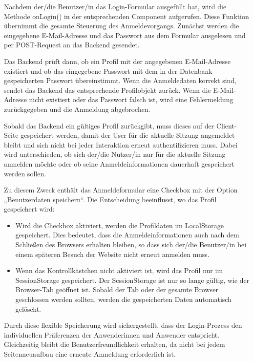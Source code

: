 Nachdem der/die Benutzer/in das Login-Formular ausgefüllt hat, wird die Methode onLogin() in der entsprechenden Component aufgerufen. Diese Funktion übernimmt die gesamte Steuerung des Anmeldevorgangs. Zunächst werden die eingegebene E-Mail-Adresse und das Passwort aus dem Formular ausgelesen und per POST-Request an das Backend gesendet.

Das Backend prüft dann, ob ein Profil mit der angegebenen E-Mail-Adresse existiert und ob das eingegebene Passwort mit dem in der Datenbank gespeicherten Passwort übereinstimmt. Wenn die Anmeldedaten korrekt sind, sendet das Backend das entsprechende Profilobjekt zurück. Wenn die E-Mail-Adresse nicht existiert oder das Passwort falsch ist, wird eine Fehlermeldung zurückgegeben und die Anmeldung abgebrochen.

Sobald das Backend ein gültiges Profil zurückgibt, muss dieses auf der Client-Seite gespeichert werden, damit der User für die aktuelle Sitzung angemeldet bleibt und sich nicht bei jeder Interaktion erneut authentifizieren muss. Dabei wird unterschieden, ob sich der/die Nutzer/in nur für die aktuelle Sitzung anmelden möchte oder ob seine Anmeldeinformationen dauerhaft gespeichert werden sollen.

Zu diesem Zweck enthält das Anmeldeformular eine Checkbox mit der Option „Benutzerdaten speichern“. Die Entscheidung beeinflusst, wo das Profil gespeichert wird:

\begin{itemize}

    \item 
    Wird die Checkbox aktiviert, werden die Profildaten im LocalStorage gespeichert. Dies bedeutet, dass die Anmeldeinformationen auch nach dem Schließen des Browsers erhalten bleiben, so dass sich der/die Benutzer/in bei einem späteren Besuch der Website nicht erneut anmelden muss.

    \item 
    Wenn das Kontrollkästchen nicht aktiviert ist, wird das Profil nur im SessionStorage gespeichert. Der SessionStorage ist nur so lange gültig, wie der Browser-Tab geöffnet ist. Sobald der Tab oder der gesamte Browser geschlossen werden sollten, werden die gespeicherten Daten automatisch gelöscht.

\end{itemize}

Durch diese flexible Speicherung wird sichergestellt, dass der Login-Prozess den individuellen Präferenzen der Anwenderinnen und Anwender entspricht. Gleichzeitig bleibt die Benutzerfreundlichkeit erhalten, da nicht bei jedem Seitenneuaufbau eine erneute Anmeldung erforderlich ist.


